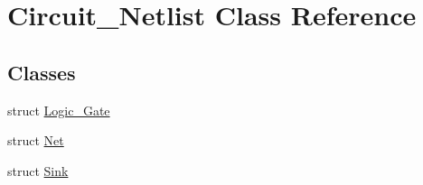 \hypertarget{classCircuit__Netlist}{\section{Circuit\-\_\-\-Netlist Class Reference}
\label{classCircuit__Netlist}
}
\subsection*{Classes}
\begin{DoxyCompactItemize}
\item 
struct \hyperlink{structCircuit__Netlist_1_1Logic__Gate}{Logic\-\_\-\-Gate}
\item 
struct \hyperlink{structCircuit__Netlist_1_1Net}{Net}
\item 
struct \hyperlink{structCircuit__Netlist_1_1Sink}{Sink}
\end{DoxyCompactItemize}
